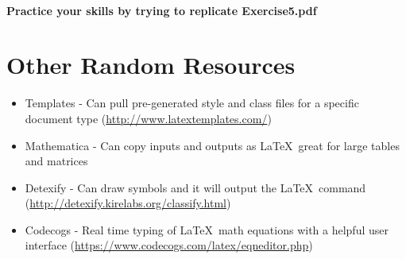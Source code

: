 \documentclass[]{article}%
\theoremstyle{definition}
\begin{document}
\paragraph{Practice your  skills by trying to replicate Exercise5.pdf}

\clearpage
\section{Other Random Resources}
\begin{itemize}
\item Templates - Can pull pre-generated style and class files for a specific document type (\url{http://www.latextemplates.com/})
\item Mathematica - Can copy inputs and outputs as \LaTeX\, great for large tables and matrices
\item Detexify - Can draw symbols and it will output the \LaTeX\ command (\url{http://detexify.kirelabs.org/classify.html})
\item Codecogs  - Real time typing of \LaTeX\ math equations with a helpful user interface (\url{https://www.codecogs.com/latex/eqneditor.php})
\end{itemize}

\clearpage


\end{document}
